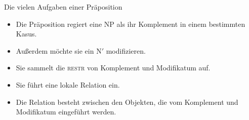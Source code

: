 \begin{frame}
\begin{minipage}{0.525\textwidth}
    Die vielen Aufgaben einer Präposition\\
    \Halbzeile
    \begin{itemize}[<+->]\small
      \item Die Präposition \alert<5>{regiert eine NP als ihr Komplement in einem bestimmten Kasus}.
      \item Außerdem \alert<6>{möchte sie ein N$'$ modifizieren}.
      \item Sie \alert<7>{sammelt die \textsc{restr} von Komplement und Modifikatum auf}.
      \item Sie \alert<8>{führt eine lokale Relation ein}.
      \item Die Relation besteht \alert<9>{zwischen den Objekten, die vom Komplement und Modifikatum eingeführt werden}.
    \end{itemize}
  \end{minipage}
\end{frame}

